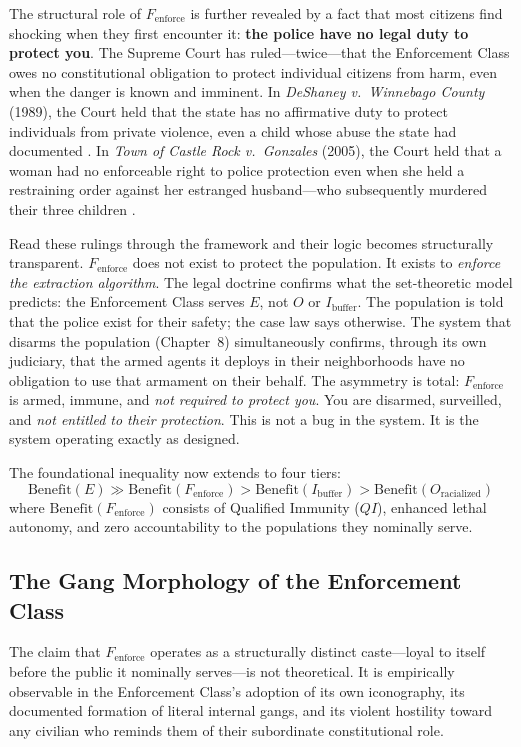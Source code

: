 \documentclass[12pt,openany]{book}
\begin{document}
The structural role of $F_{\text{enforce}}$ is further revealed by a fact that most citizens find shocking when they first encounter it: \textbf{the police have no legal duty to protect you}. The Supreme Court has ruled---twice---that the Enforcement Class owes no constitutional obligation to protect individual citizens from harm, even when the danger is known and imminent. In \textit{DeShaney v.\ Winnebago County} (1989), the Court held that the state has no affirmative duty to protect individuals from private violence, even a child whose abuse the state had documented \cite{deshaney}. In \textit{Town of Castle Rock v.\ Gonzales} (2005), the Court held that a woman had no enforceable right to police protection even when she held a restraining order against her estranged husband---who subsequently murdered their three children \cite{castlerock}.

Read these rulings through the framework and their logic becomes structurally transparent. $F_{\text{enforce}}$ does not exist to protect the population. It exists to \textit{enforce the extraction algorithm}. The legal doctrine confirms what the set-theoretic model predicts: the Enforcement Class serves $E$, not $O$ or $I_{\text{buffer}}$. The population is told that the police exist for their safety; the case law says otherwise. The system that disarms the population (Chapter~8) simultaneously confirms, through its own judiciary, that the armed agents it deploys in their neighborhoods have no obligation to use that armament on their behalf. The asymmetry is total: $F_{\text{enforce}}$ is armed, immune, and \textit{not required to protect you}. You are disarmed, surveilled, and \textit{not entitled to their protection}. This is not a bug in the system. It is the system operating exactly as designed.

The foundational inequality now extends to four tiers:
\[
\text{Benefit}(E) \gg \text{Benefit}(F_{\text{enforce}}) > \text{Benefit}(I_{\text{buffer}}) > \text{Benefit}(O_{\text{racialized}})
\]
where $\text{Benefit}(F_{\text{enforce}})$ consists of Qualified Immunity ($QI$), enhanced lethal autonomy, and zero accountability to the populations they nominally serve.

\subsection{The Gang Morphology of the Enforcement Class}

The claim that $F_{\text{enforce}}$ operates as a structurally distinct caste---loyal to itself before the public it nominally serves---is not theoretical. It is empirically observable in the Enforcement Class's adoption of its own iconography, its documented formation of literal internal gangs, and its violent hostility toward any civilian who reminds them of their subordinate constitutional role.
\end{document}
